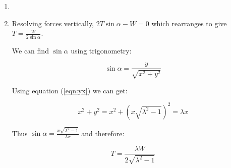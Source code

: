 \begin{problem}
{\begin{enumerate}
	   As $\lambda$ goes to infinity,  $\sqrt{\lambda^2 -1}$ goes to $\lambda$ which is much greater than $h$, thus x goes to $\frac{l}{2}$, i.e. the banner sits half way between the buildings. At the same time $y$ goes to $\frac{\lambda l}{2}$, which means the banner hangs at half the height of the total length of wire. Both of these results correspond to the banner sitting directly in the middle of the wire.
	   
	     \item {}
	   
	   \item Resolving forces vertically, $2T\sin\alpha - W = 0$ which rearranges to give $T = \frac{W}{2\sin\alpha}$.
	   
	   We can find $\sin\alpha$ using trigonometry:
	   
	    \begin{equation*}	\sin\alpha = \frac{y}{\sqrt{x^2 + y^2}} \end{equation*}
	    
	    Using equation (\ref{eqn:yx}) we can get:
	    
	  \begin{equation*} x^2 + y^2 = x^2 + (x\sqrt{\lambda^2  -1})^2 = \lambda x \end{equation*}
	  
	  Thus $\sin\alpha = \frac{x\sqrt{\lambda^2  -1}}{\lambda x}$ and therefore:
	  
	  \begin{equation*} T = \frac{\lambda W}{2\sqrt{\lambda^2  -1}} \end{equation*}
	  
	  
	  
	  

\end{enumerate}}
\end{problem}
